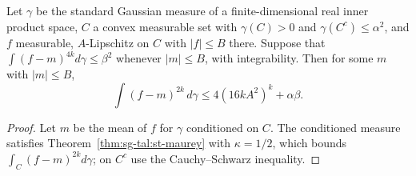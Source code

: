 \begin{lemma}\label{lem:sg-tal:st-convex-set}
  \leanok
Let $\gamma$ be the standard Gaussian measure of a finite-dimensional real inner product space, $C$ a convex
measurable set with $\gamma(C)>0$ and $\gamma(C^c)\le\alpha^2$, and $f$ measurable, $A$-Lipschitz on $C$ with
$|f|\le B$ there. Suppose that $\int(f-m)^{4k}d\gamma\le\beta^2$ whenever $|m|\le B$, with integrability. Then
for some $m$ with $|m|\le B$,
\[
\int(f-m)^{2k}\,d\gamma\le4(16kA^2)^k+\alpha\beta .
\]
\end{lemma}
\begin{proof}
  \leanok
Let $m$ be the mean of $f$ for $\gamma$ conditioned on $C$. The conditioned measure satisfies
Theorem~\ref{thm:sg-tal:st-maurey} with $\kappa=1/2$, which bounds $\int_C(f-m)^{2k}d\gamma$; on $C^c$ use the
Cauchy--Schwarz inequality.
\end{proof}

